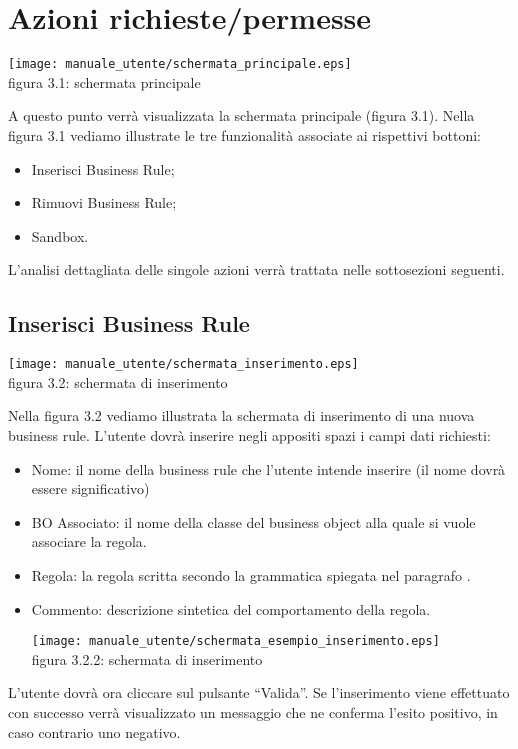 \section{Azioni richieste/permesse}
\begin{center}
\texttt{[image: manuale\_utente/schermata\_principale.eps]}\\
 figura 3.1: schermata principale
\end{center}
A questo punto verr\`a visualizzata la schermata principale (figura 3.1).
Nella figura 3.1 vediamo illustrate le tre funzionalit\`a associate ai rispettivi bottoni:
\begin{itemize}
\item Inserisci Business Rule;
\item Rimuovi Business Rule;
\item Sandbox.
\end{itemize}
L'analisi dettagliata delle singole azioni verr\`a trattata nelle sottosezioni seguenti.
\subsection{Inserisci Business Rule}
\begin{center}
\texttt{[image: manuale\_utente/schermata\_inserimento.eps]}\\
 figura 3.2: schermata di inserimento
\end{center}
Nella figura 3.2 vediamo illustrata la schermata di inserimento di una nuova business rule. L'utente dovr\`a inserire negli appositi spazi i campi dati richiesti:
\begin{itemize}
\item Nome: il nome della business rule che l'utente intende inserire (il nome dovr\`a essere significativo)
\item BO Associato: il nome della classe del business object alla quale si vuole associare la regola.
\item Regola: la regola scritta secondo la grammatica spiegata nel paragrafo \Grammatica.
\item Commento: descrizione sintetica del comportamento della regola. 
\begin{center}
\texttt{[image: manuale\_utente/schermata\_esempio\_inserimento.eps]}\\
 figura 3.2.2: schermata di inserimento
\end{center}
\end{itemize}
L'utente dovr\`a ora cliccare sul pulsante ``Valida''. Se l'inserimento viene effettuato con successo verr\`a visualizzato un messaggio che ne conferma l'esito positivo, in caso contrario uno negativo. 
